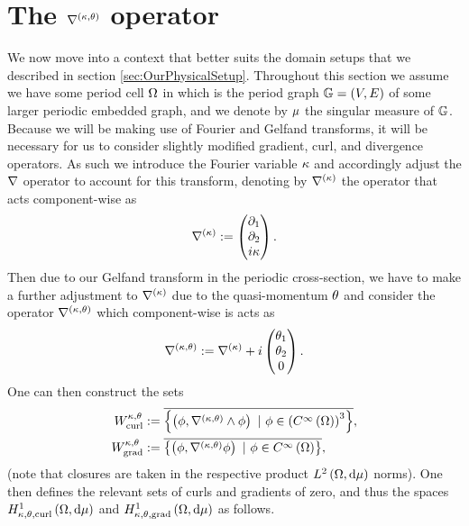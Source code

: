 \section{The $\nabla^{\left( \kappa, \theta \right)}$ operator} \label{sec:ktOperator}
We now move into a context that better suits the domain setups that we described in section \ref{sec:OurPhysicalSetup}.
Throughout this section we assume we have some period cell $\Omega$ in which is the period graph $\mathbb{G}=\left( V,E \right)$ of some larger periodic embedded graph, and we denote by $\mu$ the singular measure of $\mathbb{G}$.
Because we will be making use of Fourier and Gelfand transforms, it will be necessary for us to consider slightly modified gradient, curl, and divergence operators.
As such we introduce the Fourier variable $\kappa$ and accordingly adjust the $\nabla$ operator to account for this transform, denoting by $\nabla^{(\kappa)}$ the operator that acts component-wise as
\begin{align*}
	\nabla^{(\kappa)} := \begin{pmatrix} \partial_1 \\ \partial_2 \\ i\kappa\end{pmatrix}.
\end{align*}
Then due to our Gelfand transform in the periodic cross-section, we have to make a further adjustment to $\nabla^{(\kappa)}$ due to the quasi-momentum $\theta$ and consider the operator $\nabla^{\left( \kappa, \theta \right)}$ which component-wise is acts as
\begin{align*}
	\nabla^{\left( \kappa, \theta \right)} := \nabla^{(\kappa)} + i\begin{pmatrix} \theta_1 \\ \theta_2 \\ 0 \end{pmatrix}.
\end{align*}
One can then construct the sets
\begin{subequations} \label{eq:WktDefinitions}
	\begin{align}
		W^{\wavenumber, \qm}_{\mathrm{curl}} &:= \overline{ \clbracs{ \bracs{\phi, \ktcurl{}\phi} \ \vert \ \phi\in\bracs{\smooth{\ddom}}^3 } }, \\
		W^{\wavenumber, \qm}_{\mathrm{grad}} &:= \overline{ \clbracs{ \bracs{\phi, \ktgrad\phi} \ \vert \ \phi\in\smooth{\ddom} } },
	\end{align}
\end{subequations}
(note that closures are taken in the respective product $L^{2}\left( \Omega,\mathrm{d}\mu \right)$ norms).
One then defines the relevant sets of curls and gradients of zero, and thus the spaces $H^1_{\kappa,\theta,\mathrm{curl}}\left( \Omega, \mathrm{d}\mu \right)$ and $H^1_{\kappa,\theta,\mathrm{grad}}\left( \Omega, \mathrm{d}\mu \right)$ as follows.
